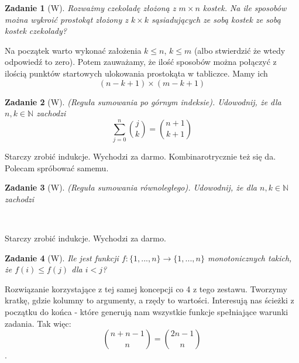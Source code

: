 \documentclass{mwbk}
\newtheorem{zad}{Zadanie}[chapter]
\begin{document}
\begin{zad}[W]
    Rozważmy czekoladę złożoną z $m\times n$ kostek.
    Na ile sposobów można wykroić prostokąt złożony z $k \times k$
    sąsiadujących ze sobą kostek ze sobą kostek czekolady?
\end{zad}
\begin{mdframed}
    Na początek warto wykonać założenia $k \leq n$, $k \leq m$
    (albo stwierdzić że wtedy odpowiedź to zero). Potem zauważamy,
    że ilość sposobów można połączyć z ilością punktów startowych
    ulokowania prostokąta w tabliczce. Mamy ich
    \[(n-k+1)\times (m-k+1)\]
\end{mdframed}




\begin{zad}[W]
    (Reguła sumowania po górnym indeksie). Udowodnij, że dla
    $n, k \in \mathbb{N}$ zachodzi
    \[\sum_{j=0}^n\binom{j}{k} = \binom{n+1}{k+1}\]
\end{zad}
\begin{mdframed}
    Starczy zrobić indukcje. Wychodzi za darmo.
    Kombinarotrycznie też się da.
    Polecam spróbować samemu.
\end{mdframed}




\begin{zad}[W]
    (Reguła sumowania równoległego). Udowodnij, że dla $n, k \in \mathbb{N}$
    zachodzi \[     \]
\end{zad}\
\begin{mdframed}
    Starczy zrobić indukcje. Wychodzi za darmo.
\end{mdframed}




\begin{zad}[W]
    Ile jest funkcji $f:\{1, ..., n\} \to \{1, ..., n\}$ monotonicznych takich,
    że $f(i) \leq f(j) $ dla $i < j$?
\end{zad}
\begin{mdframed}
    Rozwiązanie korzystające z tej samej koncepcji co 4 z tego zestawu.
    Tworzymy kratkę, gdzie kolumny to argumenty, a rzędy to wartości.
    Interesują nas ścieżki z początku do końca - które generują nam wszystkie funkcje
    spełniające warunki zadania. Tak więc:
    \[ \binom{n + n -1 }{n} = \binom{2n-1}{n} \].
\end{mdframed}
\end{document}
